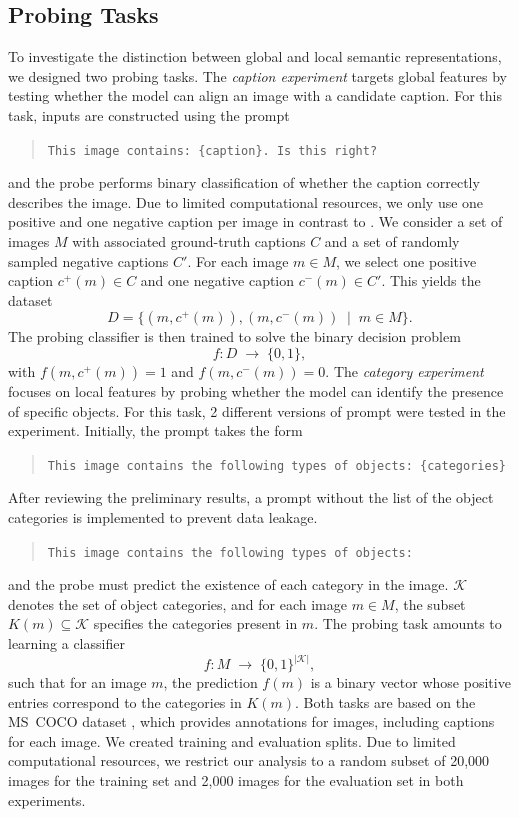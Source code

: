 \documentclass[11pt]{article}
\begin{document}
\subsection{Probing Tasks}
To investigate the distinction between global and local semantic representations,
we designed two probing tasks. The \emph{caption experiment} targets global features
by testing whether the model can align an image with a candidate caption.
For this task, inputs are constructed using the prompt
\begin{quote}
\texttt{This image contains: \{caption\}. Is this right?}
\end{quote}
and the probe performs binary classification of whether the caption correctly describes the image. Due to limited computational resources, we only use one positive and one negative caption per image in contrast to \cite{tao2024probingmultimodallargelanguage}.
We consider a set of images $M$ with associated ground-truth captions $C$
and a set of randomly sampled negative captions $C'$.
For each image $m \in M$, we select one positive caption $c^+(m) \in C$
and one negative caption $c^-(m) \in C'$.
This yields the dataset
\[
D = \{(m, c^+(m)), (m, c^-(m)) \;\mid\; m \in M\}.
\]
The probing classifier is then trained to solve the binary decision problem
\[
f : D \;\rightarrow\; \{0,1\},
\]
with $f(m, c^+(m)) = 1$ and $f(m, c^-(m)) = 0$.
The \emph{category experiment} focuses on local features by probing whether the model
can identify the presence of specific objects. For this task, 2 different versions of prompt were tested in the experiment.
Initially, the prompt takes the form
\begin{quote}
\texttt{This image contains the following types of objects: \{categories\}}
\end{quote}
After reviewing the preliminary results, a prompt without the list of the object categories is implemented to prevent data leakage.
\begin{quote}
\texttt{This image contains the following types of objects: }
\end{quote}
and the probe must predict the existence of each category in the image. $\mathcal{K}$ denotes the set of object categories, and for each image $m \in M$,
the subset $K(m) \subseteq \mathcal{K}$ specifies the categories present in $m$.
The probing task amounts to learning a classifier
\[
f : M \;\rightarrow\; \{0,1\} ^{|\mathcal{K}|},
\]
such that for an image $m$, the prediction $f(m)$ is a binary vector whose positive entries correspond to the categories in $K(m)$.
Both tasks are based on the MS~COCO dataset \cite{lin2014microsoft}, which provides annotations
for images, including captions for each image. We created
training and evaluation splits. Due to limited computational resources, we restrict our analysis to a random subset of 20,000 images for the training set and 2,000 images for the evaluation set in both experiments.
\end{document}
